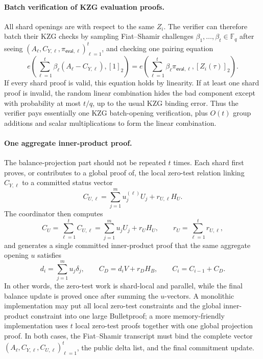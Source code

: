 \documentclass[runningheads]{llncs}
\newcommand{\F}{\mathbb{F}}
\begin{document}
\paragraph{Batch verification of KZG evaluation proofs.}
All shard openings are with respect to the same \(Z_i\).  The verifier can therefore batch their KZG checks by sampling Fiat--Shamir challenges \(\beta_1,\ldots,\beta_t\in\F_q\) after seeing \((A_\ell,C_{Y,\ell},\pi_{\mathsf{eval},\ell})_{\ell=1}^t\), and checking one pairing equation
\[
        e\!\left(\sum_{\ell=1}^t\beta_\ell(A_\ell-C_{Y,\ell}),[1]_2\right)
        =
        e\!\left(\sum_{\ell=1}^t\beta_\ell\pi_{\mathsf{eval},\ell},[Z_i(\tau)]_2\right).
\]
If every shard proof is valid, this equation holds by linearity.  If at least one shard proof is invalid, the random linear combination hides the bad component except with probability at most \(t/q\), up to the usual KZG binding error.  Thus the verifier pays essentially one KZG batch-opening verification, plus \(O(t)\) group additions and scalar multiplications to form the linear combination.

\paragraph{One aggregate inner-product proof.}
The balance-projection part should not be repeated \(t\) times.  Each shard first proves, or contributes to a global proof of, the local zero-test relation linking \(C_{Y,\ell}\) to a committed status vector
\[
        C_{U,\ell}=\sum_{j=1}^m u_j^{(\ell)}U_j+r_{U,\ell}H_U .
\]
The coordinator then computes
\[
        C_U=\sum_{\ell=1}^t C_{U,\ell}
            =\sum_{j=1}^m u_jU_j+r_UH_U,
        \qquad r_U=\sum_{\ell=1}^t r_{U,\ell},
\]
and generates a single committed inner-product proof that the same aggregate opening \(u\) satisfies
\[
        d_i=\sum_{j=1}^m u_j\delta_j,
        \qquad
        C_D=d_iV+r_DH_B,
        \qquad
        C_i=C_{i-1}+C_D.
\]
In other words, the zero-test work is shard-local and parallel, while the final balance update is proved once after summing the \(u\)-vectors.  A monolithic implementation may put all local zero-test constraints and the global inner-product constraint into one large Bulletproof; a more memory-friendly implementation uses \(t\) local zero-test proofs together with one global projection proof.  In both cases, the Fiat--Shamir transcript must bind the complete vector \((A_\ell,C_{Y,\ell},C_{U,\ell})_{\ell=1}^t\), the public delta list, and the final commitment update.
\end{document}
